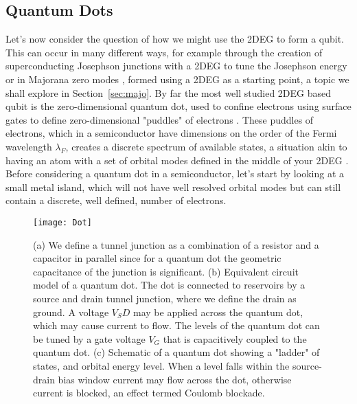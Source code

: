 \subsection{Quantum Dots}
\label{sec:qd}
Let's now consider the question of how we might use the 2DEG to form a qubit. This can occur in many different
ways, for example through the creation of superconducting Josephson junctions with a 2DEG to tune the Josephson
energy \cite{karl-gatemon} or in Majorana zero modes \cite{PhysRevLett.119.136803}, formed using a 2DEG as a starting
point, a topic we shall explore in Section~\ref{sec:majo}. By far the most well studied 2DEG based qubit is the zero-dimensional
quantum dot, used to confine electrons using surface gates to define zero-dimensional "puddles" of electrons
\cite{RevModPhys.79.1217,RevModPhys.75.1}.
These puddles of electrons, which in a semiconductor have dimensions on the order of the Fermi wavelength $\lambda_F$,
creates a discrete spectrum of available states, a situation akin to having an atom with a set of orbital modes
defined in the middle of your 2DEG \cite{PhysRevLett.77.3613}. Before considering a quantum dot in a semiconductor, let's
start by looking at a small metal island, which will not have well resolved orbital modes but can still contain a discrete,
well defined, number of electrons.

\begin{figure}
  \texttt{[image: Dot]}
  \caption[Schematic of a single quantum dot]
  {\label{fig:QD}(a) We define a tunnel junction as a combination of a resistor and a capacitor in parallel
  since for a quantum dot the geometric capacitance of the junction is significant. (b) Equivalent circuit
  model of a quantum dot. The dot is connected to reservoirs by a source and drain tunnel junction, where
  we define the drain as ground. A voltage $V_SD$ may be applied across the quantum dot, which may cause current
  to flow. The levels of the quantum dot can be tuned by a gate voltage $V_G$ that is capacitively coupled to the
  quantum dot. (c) Schematic of a quantum dot showing a "ladder" of states, and orbital energy level. When a level
  falls within the source-drain bias window current may flow across the dot, otherwise current is blocked, an
  effect termed Coulomb blockade.}
\end{figure}

